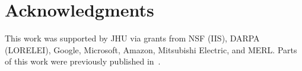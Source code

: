 \section{Acknowledgments}
This work was
supported by JHU via grants from NSF (IIS), DARPA (LORELEI),
Google, Microsoft, Amazon, Mitsubishi Electric, and MERL.  Parts of
this work were previously published in~\cite{Liu15}.
